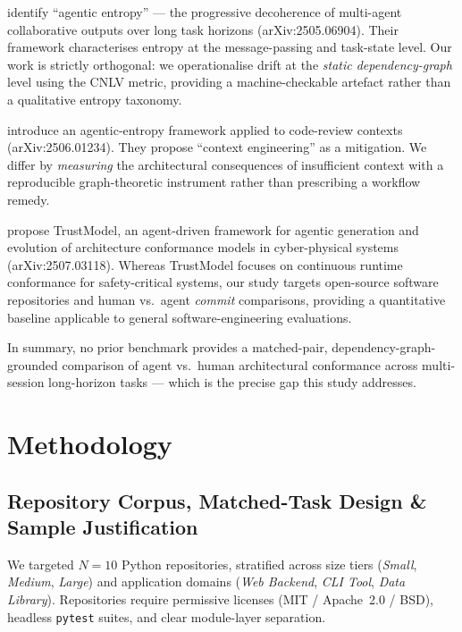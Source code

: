 \documentclass[11pt]{article}
\begin{document}
\citet{agenticentropy} identify ``agentic entropy'' --- the progressive
decoherence of multi-agent collaborative outputs over long task horizons
(arXiv:2505.06904). Their framework characterises entropy at the
message-passing and task-state level. Our work is strictly orthogonal:
we operationalise drift at the \emph{static dependency-graph} level
using the CNLV metric, providing a machine-checkable artefact rather
than a qualitative entropy taxonomy.

\citet{beyondthediff} introduce an agentic-entropy framework applied to
code-review contexts (arXiv:2506.01234). They propose ``context
engineering'' as a mitigation. We differ by \emph{measuring} the
architectural consequences of insufficient context with a reproducible
graph-theoretic instrument rather than prescribing a workflow remedy.

\citet{trustmodel} propose TrustModel, an agent-driven framework for
agentic generation and evolution of architecture conformance models in
cyber-physical systems (arXiv:2507.03118). Whereas TrustModel focuses
on continuous runtime conformance for safety-critical systems, our study
targets open-source software repositories and human vs.~agent \emph{commit}
comparisons, providing a quantitative baseline applicable to general
software-engineering evaluations.

In summary, no prior benchmark provides a matched-pair,
dependency-graph-grounded comparison of agent vs.~human architectural
conformance across multi-session long-horizon tasks --- which is the
precise gap this study addresses.


\section{Methodology}
\label{sec:methodology}


\subsection{Repository Corpus, Matched-Task Design \& Sample Justification}
\label{sec:repository-corpus}

We targeted $N = 10$ Python repositories, stratified across size tiers
(\emph{Small}, \emph{Medium}, \emph{Large}) and application domains
(\emph{Web Backend}, \emph{CLI Tool}, \emph{Data Library}).
Repositories require permissive licenses (MIT / Apache~2.0 / BSD),
headless \texttt{pytest} suites, and clear module-layer separation.
\end{document}
